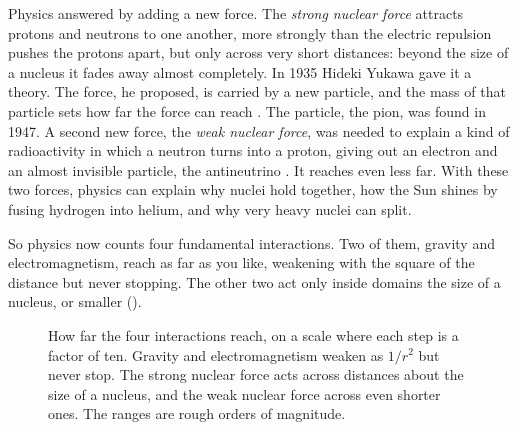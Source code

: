 Physics answered by adding a new force. The \emph{strong nuclear force} attracts protons and neutrons to one another, more strongly than the electric repulsion pushes the protons apart, but only across very short distances: beyond the size of a nucleus it fades away almost completely. In 1935 Hideki Yukawa gave it a theory. The force, he proposed, is carried by a new particle, and the mass of that particle sets how far the force can reach \citep{Yukawa1935}. The particle, the pion, was found in 1947. A second new force, the \emph{weak nuclear force}, was needed to explain a kind of radioactivity in which a neutron turns into a proton, giving out an electron and an almost invisible particle, the antineutrino \citep{Fermi1934}. It reaches even less far. With these two forces, physics can explain why nuclei hold together, how the Sun shines by fusing hydrogen into helium, and why very heavy nuclei can split.

So physics now counts four fundamental interactions. Two of them, gravity and electromagnetism, reach as far as you like, weakening with the square of the distance but never stopping. The other two act only inside domains the size of a nucleus, or smaller ().

\begin{figure}[tb]
\myfloatalign
{}
\caption[How far the four interactions reach]{How far the four interactions reach, on a scale where each step is a factor of ten. Gravity and electromagnetism weaken as $1/r^2$ but never stop. The strong nuclear force acts across distances about the size of a nucleus, and the weak nuclear force across even shorter ones. The ranges are rough orders of magnitude.}
\label{fig:ranges}
\end{figure}

